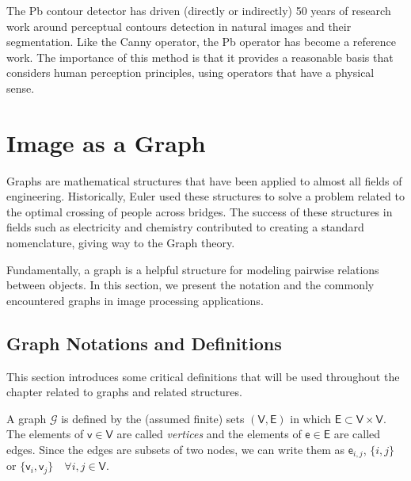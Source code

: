 The Pb contour detector has driven (directly or indirectly) 50 years of research work around perceptual contours detection in natural images and their segmentation. Like the Canny operator, the Pb operator has become a reference work. The importance of this method is that it provides a reasonable basis that considers human perception principles, using operators that have a physical sense. 


\section{Image as a Graph}

Graphs are mathematical structures that have been applied to almost all fields of engineering. Historically, Euler used these structures to solve a problem related to the optimal crossing of people across bridges. The success of these structures in fields such as electricity and chemistry contributed to creating a standard nomenclature, giving way to the Graph theory. 

Fundamentally, a graph is a helpful structure for modeling pairwise relations between objects. In this section, we present the notation and the commonly encountered graphs in image processing applications. 





\subsection{Graph Notations and Definitions}

This section introduces some critical definitions that will be used throughout the chapter related to graphs and related structures. 

\theoremstyle{definition}
\begin{definition}[Graph]
	A graph $\mathcal{G}$ is defined by the (assumed finite) sets $(\mathsf{V}, \mathsf{E})$ in which $\mathsf{E} \subset \mathsf{V} \times \mathsf{V}$. The elements of $\mathsf{v} \in \mathsf{V}$ are called \textit{vertices} and the elements of $\mathsf{e} \in \mathsf{E}$ are called edges. Since the edges are subsets of two nodes, we can write them as $\mathsf{e}_{i,j}$, $\{i, j\}$ or $\{\mathsf{v}_{i}, \mathsf{v}_{j}\} \quad \forall i, j \in \mathsf{V}$.
\end{definition}

